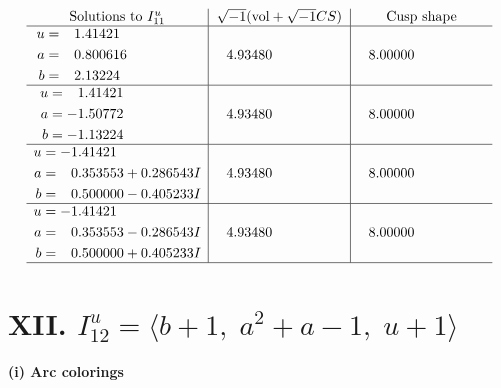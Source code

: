 \documentclass[1p]{elsarticle_modified}
\theoremstyle{definition}
\newcommand{\I}{\sqrt{-1}}
\begin{document}
$$\begin{array}{c|c|c}  
\text{Solutions to }I^u_{11}& \I (\text{vol} + \sqrt{-1}CS) & \text{Cusp shape}\\
 \hline 
\begin{aligned}
u &= \phantom{-}1.41421\phantom{ +0.000000I} \\
a &= \phantom{-}0.800616\phantom{ +0.000000I} \\
b &= \phantom{-}2.13224\phantom{ +0.000000I}\end{aligned}
 & \phantom{-}4.93480\phantom{ +0.000000I} & \phantom{-}8.00000\phantom{ +0.000000I} \\ \hline\begin{aligned}
u &= \phantom{-}1.41421\phantom{ +0.000000I} \\
a &= -1.50772\phantom{ +0.000000I} \\
b &= -1.13224\phantom{ +0.000000I}\end{aligned}
 & \phantom{-}4.93480\phantom{ +0.000000I} & \phantom{-}8.00000\phantom{ +0.000000I} \\ \hline\begin{aligned}
u &= -1.41421\phantom{ +0.000000I} \\
a &= \phantom{-}0.353553 + 0.286543 I \\
b &= \phantom{-}0.500000 - 0.405233 I\end{aligned}
 & \phantom{-}4.93480\phantom{ +0.000000I} & \phantom{-}8.00000\phantom{ +0.000000I} \\ \hline\begin{aligned}
u &= -1.41421\phantom{ +0.000000I} \\
a &= \phantom{-}0.353553 - 0.286543 I \\
b &= \phantom{-}0.500000 + 0.405233 I\end{aligned}
 & \phantom{-}4.93480\phantom{ +0.000000I} & \phantom{-}8.00000\phantom{ +0.000000I}\\
 \hline 
 \end{array}$$\newpage\newpage\renewcommand{\arraystretch}{1}
\centering \section*{XII. $I^u_{12}= \langle b+1,\;a^2+a-1,\;u+1 \rangle$}
\flushleft \textbf{(i) Arc colorings}\\
\end{document}
